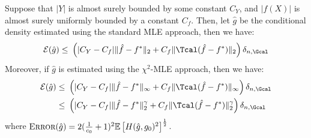 \documentclass[12pt]{extarticle} %
\newcommand{\error}{\ensuremath{\textsc{Error}}}
\begin{document}
\begin{lemma}\label{lemma:diffndiff}
    Suppose that $|Y|$ is almost surely bounded by some constant $C_Y$, and $|f(X)|$ is almost surely uniformly bounded by a constant $C_f$. Then, let $\hat{g}$ be the conditional density estimated using the standard MLE approach, then we have:
     \begin{align*}
    {\cal E}(\hat{g}) 
    \leq~& \left(|C_Y-C_f|\|\hat{f}-f^*\|_{2}+C_f\|\Tcal(\hat{f}-f^*)\|_2\right)\delta_{n,\Gcal}\\
    \end{align*}
    Moreover, if $\hat{g}$ is estimated using the $\chi^2$-MLE approach, then we have:
    \begin{align*}
    {\cal E}(\hat{g}) 
    \leq~& \left(|C_Y-C_f|\|\hat{f}-f^*\|_{\infty}+C_f\|\Tcal(\hat{f}-f^*)\|_{\infty}\right) \delta_{n,\Gcal}\\
    \leq~& \left(|C_Y-C_f|\|\hat{f}-f^*\|_{2}^{\gamma}+C_f\|\Tcal(\hat{f}-f^*)\|_{2}^{\gamma}\right) \delta_{n,\Gcal}\\
    \end{align*} where $\error(\hat{g}) =2(\frac{1}{c_0} + 1)^2\mathbb{E}\left[H(\hat{g},g_0)^2\right]^{\frac{1}{2}}$.
\end{lemma}
\end{document}
